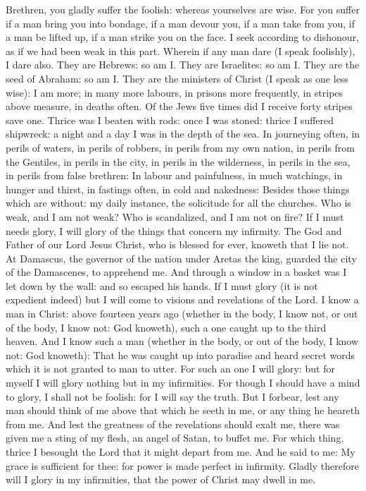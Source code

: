 Brethren, you gladly suffer the foolish: whereas yourselves are wise.  For you suffer
if a man bring you into bondage, if a man devour you, if a man take from you,
if a man be lifted up, if a man strike you on the face.  I seek according to
dishonour, as if we had been weak in this part. Wherein if any man dare (I
speak foolishly), I dare also.  They are Hebrews: so am I. They are Israelites:
so am I.  They are the seed of Abraham: so am I.  They are the ministers of
Christ (I speak as one less wise): I am more; in many more labours, in prisons
more frequently, in stripes above measure, in deaths often.  Of the Jews five
times did I receive forty stripes save one.  Thrice was I beaten with rods:
once I was stoned: thrice I suffered shipwreck: a night and a day I was in the
depth of the sea.  In journeying often, in perils of waters, in perils of
robbers, in perils from my own nation, in perils from the Gentiles, in perils
in the city, in perils in the wilderness, in perils in the sea, in perils from
false brethren: In labour and painfulness, in much watchings, in hunger and
thirst, in fastings often, in cold and nakedness: Besides those things which
are without: my daily instance, the solicitude for all the churches.
 Who is weak, and I am not weak? Who is scandalized, and I am not on
fire?  If I must needs glory, I will glory of the things that concern my
infirmity.  The God and Father of our Lord Jesus Christ, who is blessed for
ever, knoweth that I lie not.  At Damascus, the governor of the nation under
Aretas the king, guarded the city of the Damascenes, to apprehend me.  And
through a window in a basket was I let down by the wall: and so escaped his
hands.  If I must glory (it is not expedient indeed) but I will come to visions
and revelations of the Lord.  I know a man in Christ: above fourteen years ago
(whether in the body, I know not, or out of the body, I know not: God knoweth),
such a one caught up to the third heaven.  And I know such a man (whether in
the body, or out of the body, I know not: God knoweth): That he was caught up
into paradise and heard secret words which it is not granted to man to utter.
For such an one I will glory: but for myself I will glory nothing but in my
infirmities.  For though I should have a mind to glory, I shall not be foolish:
for I will say the truth. But I forbear, lest any man should think of me above
that which he seeth in me, or any thing he heareth from me.  And lest the
greatness of the revelations should exalt me, there was given me a sting of my
flesh, an angel of Satan, to buffet me.  For which thing, thrice I besought the
Lord that it might depart from me.  And he said to me: My grace is sufficient
for thee: for power is made perfect in infirmity. Gladly therefore will I glory
in my infirmities, that the power of Christ may dwell in me.  


